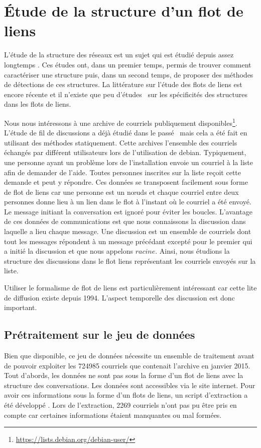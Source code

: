 

\chapter{Étude de la structure d'un flot de liens}

L'étude de la structure des réseaux est un sujet qui est étudié depuis assez longtemps \REF.
Ces études ont, dans un premier temps, permis de trouver comment caractériser une structure puis, dans un second temps, de proposer des méthodes de détections de ces structures.
La littérature sur l'étude des flots de liens est encore récente et il n'existe que peu d'études \REF\ sur les spécificités des structures dans les flots de liens.

Nous nous intéressons à une archive de courriels publiquement disponibles\footnote{\url{https://lists.debian.org/debian-user/}}.
L'étude de fil de discussions a déjà étudié dans le passé~\cite{Dorat2007} mais cela a été fait en utilisant des méthodes statiquement.
Cette archives l'ensemble des courriels échangés par différent utilisateurs lors de l'utilisation de debian.
Typiquement, une personne ayant un problème lors de l'installation envoie un courriel à la liste afin de demander de l'aide.
Toutes personnes inscrites sur la liste reçoit cette demande et peut y répondre.
Ces données se transposent facilement sous forme de flot de liens car une personne est un n\oe uds et chaque courriel entre deux personnes donne lieu à un lien dans le flot à l'instant où le courriel a été envoyé.
Le message initiant la conversation est ignoré pour éviter les boucles.
L'avantage de ces données de communications est que nous connaissons la discussion dans laquelle a lieu chaque message.
Une discussion est un ensemble de courriels dont tout les messages répondent à un message précédant excepté pour le premier qui a initié la discussion et que nous appelons $racine$.
Ainsi, nous étudions la structure des discussions dans le flot liens représentant les courriels envoyés sur la liste.

Utiliser le formalisme de flot de liens est particulièrement intéressant car cette lite de diffusion existe depuis 1994.
L'aspect temporelle des discussion est donc important.



\section{Prétraitement sur le jeu de données}
Bien que disponible, ce jeu de données nécessite un ensemble de traitement avant de pouvoir exploiter les 724985 courriels que contenait l'archive en janvier 2015.
Tout d'abords, les données ne sont pas sous la forme d'un flot de liens avec la structure des conversations.
Les données sont accessibles via le site internet.
Pour avoir ces informations sous la forme d'un flots de liens, un script d'extraction a été développé .
Lors de l'extraction, 2269 courriels n'ont pas pu être pris en compte car certaines informations étaient manquantes ou mal formées.

